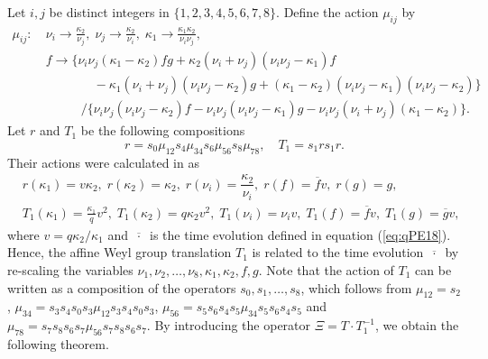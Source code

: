 \documentclass[12pt]{amsart}
\numberwithin{equation}{section}
\theoremstyle{definition}
\begin{document}
Let $i , j$ be distinct integers in $\{ 1,2,3,4,5,6,7,8 \}$.
Define the action $\mu_ {ij}$ by
\begin{align}
  \mu_ {ij}: & \: \nu_i \rightarrow\frac{\kappa_2}{\nu_j}, \; \nu_j \rightarrow \frac{\kappa_2}{\nu_i}, \; \kappa_1 \rightarrow \frac{\kappa_1\kappa_2}{\nu_i\nu_j}, \\
& \: f \rightarrow \{ \nu_i \nu_j ( \kappa_1 - \kappa_2 ) f g + \kappa_2 ( \nu_i + \nu_j ) ( \nu_i \nu_j - \kappa_1 ) f  \nonumber \\
& \qquad \qquad - \kappa_1 ( \nu_i + \nu_j ) ( \nu_i \nu_j - \kappa_2 ) g + ( \kappa_1 - \kappa_2 ) ( \nu_i \nu_j - \kappa_1 ) ( \nu_i \nu_j - \kappa_2 ) \}  \nonumber \\
& \qquad \quad / \{ \nu_i \nu_j ( \nu_i \nu_j - \kappa_2 ) f - \nu_i \nu_j ( \nu_i \nu_j - \kappa_1 ) g - \nu_i \nu_j ( \nu_i + \nu_j )( \kappa_1 - \kappa_2 ) \} .  \nonumber 
\end{align}
Let $r$ and $T_1$ be the following compositions
\begin{equation}
r=s_{0}\mu_{12}s_{4}\mu_{34}s_{6}\mu_{56}s_{8}\mu_{78}, \quad T_1= s_1 r s_1 r. \label{eq:rT1def} 
\end{equation}
Their actions were calculated in \cite{Y} as
\begin{align}
& r(\kappa _1)=v \kappa _2, \; r(\kappa _2)=\kappa _2, \; r(\nu _i)=\dfrac{\kappa _2}{\nu _i}, \;  r(f)=\overline{f} v, \;  r(g)=g, \label{eq:rT1act} \\
& T_1(\kappa _1)=\frac{\kappa _1}{q} v^2, \; T_1(\kappa _2)=q \kappa _2 v^2, \; T_1(\nu _i) = \nu _i v, \; T_1(f)=\overline{f} v, \; T_1(g)=\overline{g} v, \nonumber 
\end{align}
where $v=q\kappa _2/\kappa _1$ and  $\overline{\: \cdot \: }$ is the time evolution defined in equation (\ref{eq:qPE18}).
Hence, the affine Weyl group translation $T_1$ is related to the time evolution $\overline{\: \cdot \: }$ by re-scaling  the variables $\nu_{1}, \nu_{2}, \dots , \nu_{8} , \kappa _1 , \kappa _2, f,g $.
Note that the action of $T_1$ can be written as a composition of the operators $s_0, s_1 , \dots , s_8$, which follows from $\mu _{12} = s_2$, $\mu _{34} = s_{3} s_{4} s_{0} s_{3} \mu _{12} s_{3} s_{4} s_{0} s_{3}$, $\mu _{56} = s_{5} s_{6} s_{4} s_{5} \mu _{34} s_{5} s_{6} s_{4} s_{5}$ and $\mu _{78} = s_{7} s_{8} s_{6} s_{7} \mu _{56} s_{7} s_{8} s_{6} s_{7}$.
By introducing the operator $\Xi = T \cdot T_1^{-1}$, we obtain the following theorem.
\end{document}
